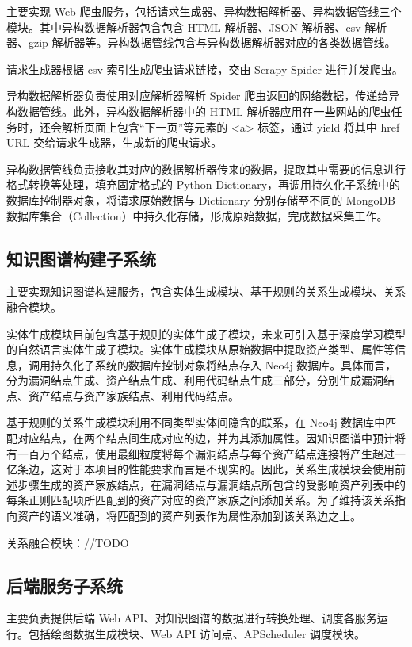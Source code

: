 \documentclass[a4paper,AutoFakeBold,oneside,12pt]{book}
\begin{document}
主要实现 Web 爬虫服务，包括请求生成器、异构数据解析器、异构数据管线三个模块。其中异构数据解析器包含包含 HTML 解析器、JSON 解析器、csv 解析器、gzip 解析器等。异构数据管线包含与异构数据解析器对应的各类数据管线。

请求生成器根据 csv 索引生成爬虫请求链接，交由 Scrapy Spider 进行并发爬虫。

异构数据解析器负责使用对应解析器解析 Spider 爬虫返回的网络数据，传递给异构数据管线。此外，异构数据解析器中的 HTML 解析器应用在一些网站的爬虫任务时，还会解析页面上包含“下一页”等元素的 <a> 标签，通过 yield 将其中 href URL 交给请求生成器，生成新的爬虫请求。

异构数据管线负责接收其对应的数据解析器传来的数据，提取其中需要的信息进行格式转换等处理，填充固定格式的 Python Dictionary，再调用持久化子系统中的数据库控制器对象，将请求原始数据与 Dictionary 分别存储至不同的 MongoDB 数据库集合（Collection）中持久化存储，形成原始数据，完成数据采集工作。

\subsection{知识图谱构建子系统}

主要实现知识图谱构建服务，包含实体生成模块、基于规则的关系生成模块、关系融合模块。

实体生成模块目前包含基于规则的实体生成子模块，未来可引入基于深度学习模型的自然语言实体生成子模块。实体生成模块从原始数据中提取资产类型、属性等信息，调用持久化子系统的数据库控制对象将结点存入 Neo4j 数据库。具体而言，分为漏洞结点生成、资产结点生成、利用代码结点生成三部分，分别生成漏洞结点、资产结点与资产家族结点、利用代码结点。

基于规则的关系生成模块利用不同类型实体间隐含的联系，在 Neo4j 数据库中匹配对应结点，在两个结点间生成对应的边，并为其添加属性。因知识图谱中预计将有一百万个结点，使用最细粒度将每个漏洞结点与每个资产结点连接将产生超过一亿条边，这对于本项目的性能要求而言是不现实的。因此，关系生成模块会使用前述步骤生成的资产家族结点，在漏洞结点与漏洞结点所包含的受影响资产列表中的每条正则匹配项所匹配到的资产对应的资产家族之间添加关系。为了维持该关系指向资产的语义准确，将匹配到的资产列表作为属性添加到该关系边之上。

关系融合模块：//TODO

\subsection{后端服务子系统}

主要负责提供后端 Web API、对知识图谱的数据进行转换处理、调度各服务运行。包括绘图数据生成模块、Web API 访问点、APScheduler 调度模块。
\end{document}
